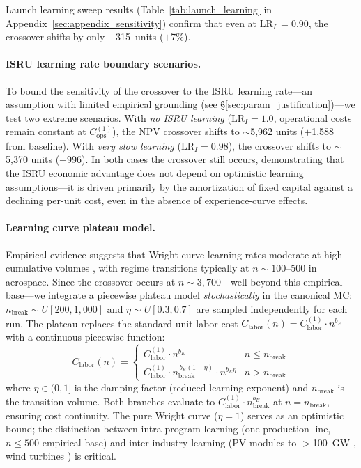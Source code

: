 Launch learning sweep results (Table~\ref{tab:launch_learning} in Appendix~\ref{sec:appendix_sensitivity}) confirm that even at $\mathrm{LR}_L = 0.90$, the crossover shifts by only $+$315~units ($+$7\%).

\paragraph{ISRU learning rate boundary scenarios.} To bound the sensitivity of the crossover to the ISRU learning rate---an assumption with limited empirical grounding (see \S\ref{sec:param_justification})---we test two extreme scenarios. With \emph{no ISRU learning} ($\mathrm{LR}_I = 1.0$, operational costs remain constant at $C_{\mathrm{ops}}^{(1)}$), the NPV crossover shifts to $\sim$5{,}962 units ($+$1{,}588 from baseline). With \emph{very slow learning} ($\mathrm{LR}_I = 0.98$), the crossover shifts to $\sim$5{,}370 units ($+$996). In both cases the crossover still occurs, demonstrating that the ISRU economic advantage does not depend on optimistic learning assumptions---it is driven primarily by the amortization of fixed capital against a declining per-unit cost, even in the absence of experience-curve effects.

\paragraph{Learning curve plateau model.} Empirical evidence suggests that Wright curve learning rates moderate at high cumulative volumes \cite{argote1990,thompson2012,benkard2000}, with regime transitions typically at $n \sim 100$--$500$ in aerospace. Since the crossover occurs at $n \sim 3{,}700$---well beyond this empirical base---we integrate a piecewise plateau model \emph{stochastically} in the canonical MC: $n_{\mathrm{break}} \sim U[200, 1{,}000]$ and $\eta \sim U[0.3, 0.7]$ are sampled independently for each run. The plateau replaces the standard unit labor cost $C_{\mathrm{labor}}(n) = C_{\mathrm{labor}}^{(1)} \cdot n^{b_E}$ with a continuous piecewise function:
\begin{equation}
  C_{\mathrm{labor}}(n) = \begin{cases}
    C_{\mathrm{labor}}^{(1)} \cdot n^{b_E} & n \leq n_{\mathrm{break}} \\[4pt]
    C_{\mathrm{labor}}^{(1)} \cdot n_{\mathrm{break}}^{\,b_E(1-\eta)} \cdot n^{b_E \eta} & n > n_{\mathrm{break}}
  \end{cases}
\end{equation}
where $\eta \in (0,1]$ is the damping factor (reduced learning exponent) and $n_{\mathrm{break}}$ is the transition volume. Both branches evaluate to $C_{\mathrm{labor}}^{(1)} \cdot n_{\mathrm{break}}^{b_E}$ at $n = n_{\mathrm{break}}$, ensuring cost continuity. The pure Wright curve ($\eta = 1$) serves as an optimistic bound; the distinction between intra-program learning (one production line, $n \leq 500$ empirical base) and inter-industry learning (PV modules to $>$100~GW \cite{kavlak2018}, wind turbines \cite{rubin2015}) is critical.

